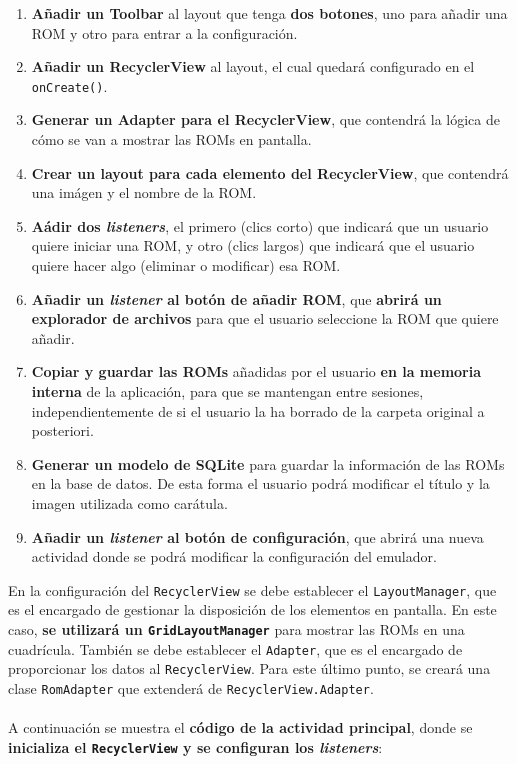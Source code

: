 \begin{enumerate}
    \item \textbf{Añadir un Toolbar} al layout que tenga \textbf{dos botones}, uno para añadir una ROM y otro para entrar a la configuración.
    \item \textbf{Añadir un RecyclerView} al layout, el cual quedará configurado en el \texttt{onCreate()}.
    \item \textbf{Generar un Adapter para el RecyclerView}, que contendrá la lógica de cómo se van a mostrar las ROMs en pantalla.
    \item \textbf{Crear un layout para cada elemento del RecyclerView}, que contendrá una imágen y el nombre de la ROM.
    \item \textbf{Aádir dos \textit{listeners}}, el primero (clics corto) que indicará que un usuario quiere iniciar una ROM, y otro (clics largos) que indicará que el usuario quiere hacer algo (eliminar o modificar) esa ROM.
    \item \textbf{Añadir un \textit{listener} al botón de añadir ROM}, que \textbf{abrirá un explorador de archivos} para que el usuario seleccione la ROM que quiere añadir.
    \item \textbf{Copiar y guardar las ROMs} añadidas por el usuario \textbf{en la memoria interna} de la aplicación, para que se mantengan entre sesiones, independientemente de si el usuario la ha borrado de la carpeta original a posteriori.
    \item \textbf{Generar un modelo de SQLite} para guardar la información de las ROMs en la base de datos. De esta forma el usuario podrá modificar el título y la imagen utilizada como carátula. 
    \item \textbf{Añadir un \textit{listener} al botón de configuración}, que abrirá una nueva actividad donde se podrá modificar la configuración del emulador.
\end{enumerate}

En la configuración del \texttt{RecyclerView} se debe establecer el \texttt{LayoutManager}, que es el encargado de gestionar la disposición de los elementos en pantalla. En este caso, \textbf{se utilizará un \texttt{GridLayoutManager}} para mostrar las ROMs en una cuadrícula. También se debe establecer el \texttt{Adapter}, que es el encargado de proporcionar los datos al \texttt{RecyclerView}. Para este último punto, se creará una clase \texttt{RomAdapter} que extenderá de \texttt{RecyclerView.Adapter}.
\\\\
A continuación se muestra el \textbf{código de la actividad principal}, donde se \textbf{inicializa el \texttt{RecyclerView} y se configuran los \textit{listeners}}:

